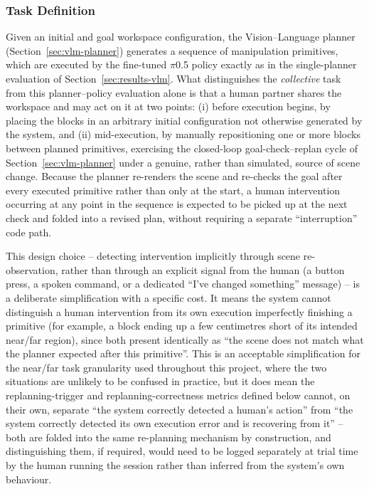 \documentclass[12pt]{article}
\begin{document}
\subsubsection{Task Definition}
Given an initial and goal workspace configuration, the Vision--Language planner (Section~\ref{sec:vlm-planner}) generates a sequence of manipulation primitives, which are executed by the fine-tuned $\pi$0.5 policy exactly as in the single-planner evaluation of Section~\ref{sec:results-vlm}. What distinguishes the \emph{collective} task from this planner--policy evaluation alone is that a human partner shares the workspace and may act on it at two points: (i) before execution begins, by placing the blocks in an arbitrary initial configuration not otherwise generated by the system, and (ii) mid-execution, by manually repositioning one or more blocks between planned primitives, exercising the closed-loop goal-check--replan cycle of Section~\ref{sec:vlm-planner} under a genuine, rather than simulated, source of scene change. Because the planner re-renders the scene and re-checks the goal after every executed primitive rather than only at the start, a human intervention occurring at any point in the sequence is expected to be picked up at the next check and folded into a revised plan, without requiring a separate ``interruption'' code path.

This design choice -- detecting intervention implicitly through scene re-observation, rather than through an explicit signal from the human (a button press, a spoken command, or a dedicated ``I've changed something'' message) -- is a deliberate simplification with a specific cost. It means the system cannot distinguish a human intervention from its own execution imperfectly finishing a primitive (for example, a block ending up a few centimetres short of its intended near/far region), since both present identically as ``the scene does not match what the planner expected after this primitive''. This is an acceptable simplification for the near/far task granularity used throughout this project, where the two situations are unlikely to be confused in practice, but it does mean the replanning-trigger and replanning-correctness metrics defined below cannot, on their own, separate ``the system correctly detected a human's action'' from ``the system correctly detected its own execution error and is recovering from it'' -- both are folded into the same re-planning mechanism by construction, and distinguishing them, if required, would need to be logged separately at trial time by the human running the session rather than inferred from the system's own behaviour.
\end{document}
